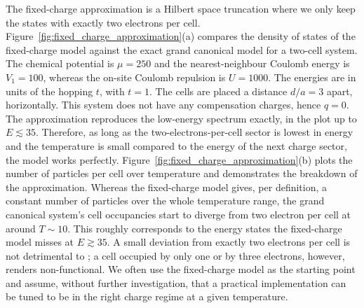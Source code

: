 The fixed-charge approximation is a Hilbert space truncation where we only keep
the states with exactly two electrons per cell.
Figure~\ref{fig:fixed_charge_approximation}(a) compares the density of states of
the fixed-charge model against the exact grand canonical model for a two-cell
system. The chemical potential is $\mu = 250$ and the nearest-neighbour Coulomb
energy is $V_1 = 100$, whereas the on-site Coulomb repulsion is $U = 1000$. The
energies are in units of the hopping $t$, with $t = 1$. The cells are placed a
distance $d/a = 3$ apart, horizontally. This system does not have any
compensation charges, hence $q = 0$. The approximation reproduces the low-energy
spectrum exactly, in the plot up to $E \lesssim 35$. Therefore, as long as the
two-electrons-per-cell sector is lowest in energy and the temperature is small
compared to the energy of the next charge sector, the model works perfectly.
Figure~\ref{fig:fixed_charge_approximation}(b) plots the number of particles per
cell over temperature and demonstrates the breakdown of the approximation.
Whereas the fixed-charge model gives, per definition, a constant number of
particles over the whole temperature range, the grand canonical system's cell
occupancies start to diverge from two electron per cell at around $T \sim 10$.
This roughly corresponds to the energy states the fixed-charge model misses at
$E \gtrsim 35$. A small deviation from exactly two electrons per cell is not
detrimental to ; a cell occupied by only one or by three electrons,
however, renders  non-functional. We often use the fixed-charge model
as the starting point and assume, without further investigation, that a
practical  implementation can be tuned to be in the right charge
regime at a given temperature.

